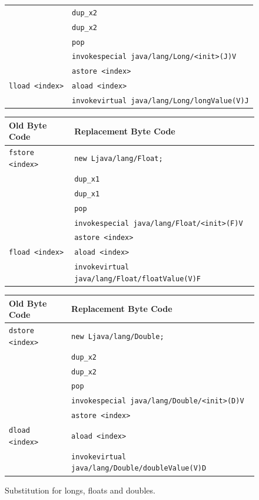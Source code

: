 \begin{center}
\begin{figure}[htb]
\begin{tabular}{| l | l |}
      & \texttt{dup\_x2} \\
      & \texttt{dup\_x2} \\
      & \texttt{pop} \\
      & \texttt{invokespecial java/lang/Long/\textless init\textgreater(J)V} \\
      & \texttt{astore \textless index\textgreater} \\
   \hline
   \texttt{lload \textless index\textgreater} & \texttt{aload \textless index\textgreater} \\
      & \texttt{invokevirtual java/lang/Long/longValue(V)J} \\
   \hline
\end{tabular}

\begin{tabular}{| l | l |}
   \hline
   Old Byte Code & Replacement Byte Code \\
   \hline
   \texttt{fstore \textless index\textgreater} & \texttt{new Ljava/lang/Float;} \\
      & \texttt{dup\_x1} \\
      & \texttt{dup\_x1} \\
      & \texttt{pop} \\
      & \texttt{invokespecial java/lang/Float/\textless init\textgreater(F)V} \\
      & \texttt{astore \textless index\textgreater} \\
   \hline
   \texttt{fload \textless index\textgreater} & \texttt{aload \textless index\textgreater} \\
      & \texttt{invokevirtual java/lang/Float/floatValue(V)F} \\
   \hline
\end{tabular}

\begin{tabular}{| l | l |}
   \hline
   Old Byte Code & Replacement Byte Code \\
   \hline
   \texttt{dstore \textless index\textgreater} & \texttt{new Ljava/lang/Double;} \\
      & \texttt{dup\_x2} \\
      & \texttt{dup\_x2} \\
      & \texttt{pop} \\
      & \texttt{invokespecial java/lang/Double/\textless init\textgreater(D)V} \\
      & \texttt{astore \textless index\textgreater} \\
   \hline
   \texttt{dload \textless index\textgreater} & \texttt{aload \textless index\textgreater} \\
      & \texttt{invokevirtual java/lang/Double/doubleValue(V)D} \\
   \hline
\end{tabular}
\caption{Substitution for longs, floats and doubles.}
\label{endsubs}
\end{figure}
\end{center}


